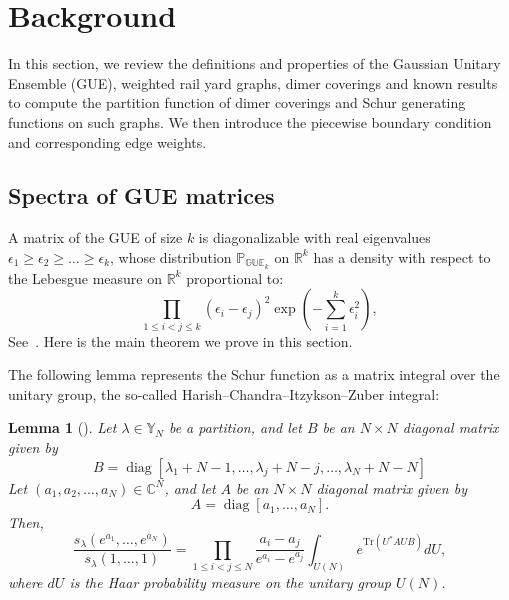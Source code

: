 \documentclass[11pt]{amsart}
\theoremstyle{plain}
\newtheorem{lemma}[theorem]{Lemma}
\theoremstyle{definition}
\theoremstyle{remark}
\newcommand\RR{{\mathbb R}}
\newcommand\PP{{\mathbb P}}
\newcommand\GUE{{\mathbb {GUE}}}
\newcommand\CC{\mathbb{C}}
\newcommand\YY{\mathbb{Y}}
\numberwithin{equation}{section}
\numberwithin{theorem}{section}
\numberwithin{figure}{section}
\begin{document}
\section{Background}\label{wryg}

In this section, we review the definitions and properties of the Gaussian Unitary Ensemble (GUE), weighted rail yard graphs, dimer coverings and known results to compute the partition function of dimer coverings and Schur generating functions on such graphs. We then introduce the piecewise boundary condition and corresponding edge weights.

\subsection{Spectra of GUE matrices}
A matrix of the GUE of size $k$ is diagonalizable with real eigenvalues $\epsilon_1\geq
\epsilon_2\geq\ldots\geq\epsilon_k$, whose distribution $\PP_{\GUE_k}$ on $\RR^k$
has a density with respect to the Lebesgue measure on $\RR^k$ proportional to:
\begin{equation*}
\prod_{1\leq i<j\leq
k}(\epsilon_i-\epsilon_j)^2\exp\left(-\sum_{i=1}^{k}\epsilon_i^2\right),
\end{equation*}
See~\cite[Theorem~3.3.1]{MM04}.
Here is the main theorem we prove in this section.




The following lemma represents the Schur function as a matrix integral over the
unitary group, the so-called Harish--Chandra--Itzykson--Zuber integral:
\begin{lemma}[\cite{hc,iz}]
  \label{hciz}
  Let $\lambda\in \YY_N$ be a partition, and let $B$ be an
  $N\times N$ diagonal matrix given by
\begin{equation*}
B=\operatorname{diag}[\lambda_1+N-1,\ldots,\lambda_j+N-j,\ldots,\lambda_N+N-N]
\end{equation*}
Let $(a_1,a_2,\ldots,a_N)\in \CC^N$, and let $A$ be an $N\times N$ diagonal matrix given by 
\begin{equation*}
A=\operatorname{diag}[a_1,\ldots,a_N].
\end{equation*}
Then,
\begin{equation}
\frac{s_{\lambda}(e^{a_1},\ldots,e^{a_N})}{s_{\lambda}(1,\ldots,1)}=\prod_{1\leq i<j\leq N}\frac{a_i-a_j}{e^{a_i}-e^{a_j}}\int_{U(N)}e^{\mathrm{Tr}(U^*AUB)}dU,
\label{shc}
\end{equation}
where $dU$ is the Haar probability measure on the unitary group $U(N)$.
\end{lemma}
\end{document}
